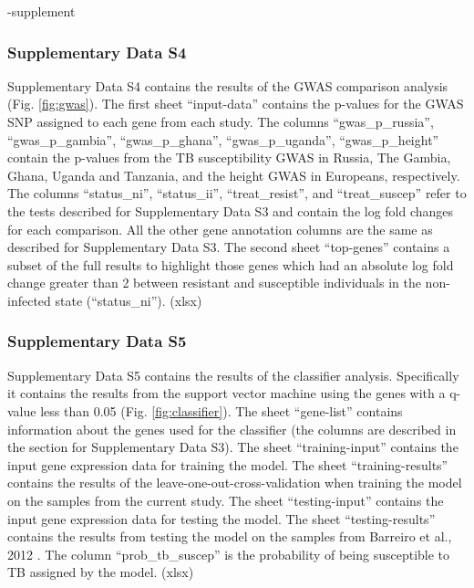\documentclass[fleqn,10pt]{wlscirep}
\begin{document}
\begin{filecontents}{\jobname-supplement}
\subsubsection*{Supplementary Data S4}

Supplementary Data S4 contains the results of the GWAS comparison
analysis (Fig. \ref{fig:gwas}). The first sheet “input-data” contains
the p-values for the GWAS SNP assigned to each gene from each study.
The columns “gwas\_p\_russia”, “gwas\_p\_gambia”, “gwas\_p\_ghana”,
“gwas\_p\_uganda”, “gwas\_p\_height” contain the p-values from the TB
susceptibility GWAS in Russia, The Gambia, Ghana, Uganda and Tanzania,
and the height GWAS in Europeans, respectively. The columns
“status\_ni”, “status\_ii”, “treat\_resist”, and “treat\_suscep” refer
to the tests described for Supplementary Data S3 and contain the log
fold changes for each comparison. All the other gene annotation
columns are the same as described for Supplementary Data S3. The
second sheet “top-genes” contains a subset of the full results to
highlight those genes which had an absolute log fold change greater
than 2 between resistant and susceptible individuals in the
non-infected state (“status\_ni”). (xlsx)
\subsubsection*{Supplementary Data S5}

Supplementary Data S5 contains the results of the classifier analysis.
Specifically it contains the results from the support vector machine
using the genes with a q-value less than 0.05 (Fig.
\ref{fig:classifier}). The sheet “gene-list” contains information
about the genes used for the classifier (the columns are described in
the section for Supplementary Data S3). The sheet “training-input”
contains the input gene expression data for training the model. The
sheet “training-results” contains the results of the
leave-one-out-cross-validation when training the model on the samples
from the current study. The sheet “testing-input” contains the input
gene expression data for testing the model. The sheet
“testing-results” contains the results from testing the model on the
samples from Barreiro et al., 2012 \cite{Barreiro2012}. The column
“prob\_tb\_suscep” is the probability of being susceptible to TB
assigned by the model. (xlsx)

\end{filecontents}


\end{document}
